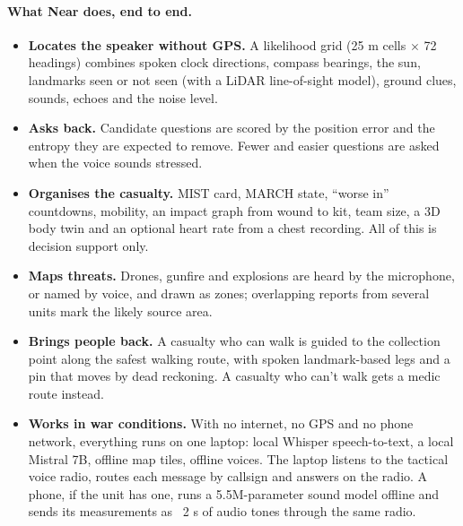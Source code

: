 \paragraph{What Near does, end to end.}
\begin{itemize}
  \item \textbf{Locates the speaker without GPS.} A likelihood grid (25 m cells $\times$ 72 headings)
        combines spoken clock directions, compass bearings, the sun, landmarks seen or not seen
        (with a LiDAR line-of-sight model), ground clues, sounds, echoes and the noise level.
  \item \textbf{Asks back.} Candidate questions are scored by the position error and the entropy they
        are expected to remove. Fewer and easier questions are asked when the voice sounds stressed.
  \item \textbf{Organises the casualty.} MIST card, MARCH state, ``worse in'' countdowns, mobility,
        an impact graph from wound to kit, team size, a 3D body twin and an optional heart rate
        from a chest recording. All of this is decision support only.
  \item \textbf{Maps threats.} Drones, gunfire and explosions are heard by the microphone, or named
        by voice, and drawn as zones; overlapping reports from several units mark the likely
        source area.
  \item \textbf{Brings people back.} A casualty who can walk is guided to the collection point along
        the safest walking route, with spoken landmark-based legs and a pin that moves by dead
        reckoning. A casualty who can't walk gets a medic route instead.
  \item \textbf{Works in war conditions.} With no internet, no GPS and no phone network, everything
        runs on one laptop: local Whisper speech-to-text, a local Mistral 7B, offline map tiles,
        offline voices. The laptop listens to the tactical voice radio, routes each message by
        callsign and answers on the radio. A phone, if the unit has one, runs a 5.5M-parameter
        sound model offline and sends its measurements as ~2 s of audio tones through the same
        radio.
\end{itemize}

